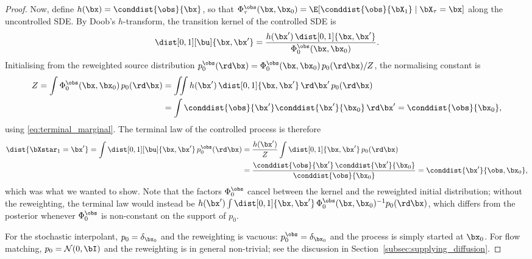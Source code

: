 \begin{proof}
Now, define $h(\bx) = \conddist{\obs}{\bx}$, so that $\Phi_{\tau}^{\obs}(\bx, \bx_0) = \E[ \conddist{\obs}{\bX_1} \mid \bX_\tau = \bx ]$ along the uncontrolled SDE. By Doob's $h$-transform, the transition kernel of the controlled SDE is
\begin{align}
    \dist[0, 1][\bu]{\bx, \bx'}
    =
    \frac{h(\bx')\,\dist[0,1]{\bx, \bx'}}{\Phi_0^{\obs}(\bx, \bx_0)}.
\end{align}
Initialising from the reweighted source distribution $p_0^{\obs}(\rd\bx) = \Phi_0^{\obs}(\bx,\bx_0)\,p_0(\rd\bx)/Z$, the normalising constant is
\begin{align}
    Z = \int \Phi_0^{\obs}(\bx, \bx_0)\, p_0(\rd\bx)
      &= \iint h(\bx')\, \dist[0,1]{\bx,\bx'}\, \rd\bx'\, p_0(\rd\bx) \nonumber\\
      &= \int \conddist{\obs}{\bx'} \conddist{\bx'}{\bx_0}\, \rd\bx'
      = \conddist{\obs}{\bx_0},
\end{align}
using \eqref{eq:terminal_marginal}. The terminal law of the controlled process is therefore
\begin{align}
    \dist{\bXstar_1 = \bx'}
    = \int \dist[0, 1][\bu]{\bx, \bx'}\, p_0^{\obs}(\rd\bx)
    &= \frac{h(\bx')}{Z} \int \dist[0,1]{\bx, \bx'}\, p_0(\rd\bx) \nonumber\\
    &= \frac{\conddist{\obs}{\bx'}\,\conddist{\bx'}{\bx_0}}{\conddist{\obs}{\bx_0}}
    = \conddist{\bx'}{\obs, \bx_0},
\end{align}
which was what we wanted to show. Note that the factors $\Phi_0^{\obs}$ cancel between the kernel and the reweighted initial distribution; without the reweighting, the terminal law would instead be $h(\bx')\int \dist[0,1]{\bx,\bx'}\,\Phi_0^{\obs}(\bx,\bx_0)^{-1} p_0(\rd\bx)$, which differs from the posterior whenever $\Phi_0^{\obs}$ is non-constant on the support of $p_0$.

For the stochastic interpolant, $p_0 = \delta_{\bx_0}$ and the reweighting is vacuous: $p_0^{\obs} = \delta_{\bx_0}$ and the process is simply started at $\bx_0$. For flow matching, $p_0 = \mathcal{N}(0,\bI)$ and the reweighting is in general non-trivial; see the discussion in Section~\ref{subsec:supplying_diffusion}.
\end{proof}


